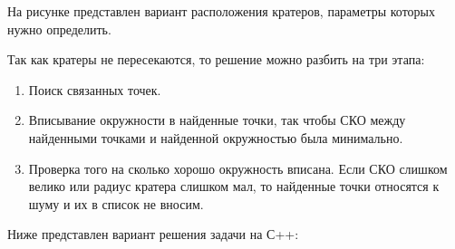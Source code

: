 \solutionSection

На рисунке представлен вариант расположения кратеров, параметры которых нужно определить.


Так как кратеры не пересекаются, то решение можно разбить на три этапа:
\begin{enumerate}
    \item Поиск связанных точек.
    \item Вписывание окружности в найденные точки, так чтобы СКО между найденными точками и найденной окружностью была минимально.
    \item Проверка того на сколько хорошо окружность вписана. Если СКО слишком велико или радиус кратера слишком мал, то найденные точки относятся к шуму и их в список не вносим.    
\end{enumerate}

Ниже представлен вариант решения задачи на С++:

\inputminted[fontsize=\footnotesize, linenos]{cpp}{final/command_tour/telecom/task_05/source.cpp}